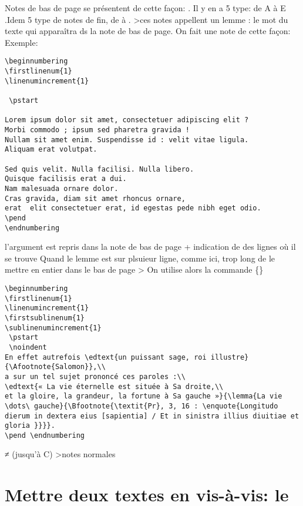 Notes de bas de page se présentent de cette façon:  . Il y en a 5 type: de A à E
.Idem 5 type de notes de fin, de  à .
>ces notes appellent un lemme : le mot du texte qui apparaîtra ds la  note de bas de page. On fait une note de cette façon: 
Exemple: 
\begin{verbatim}
\beginnumbering 
\firstlinenum{1}
\linenumincrement{1}

 \pstart 

Lorem ipsum dolor sit amet, consectetuer adipiscing elit ?
Morbi commodo ; ipsum sed pharetra gravida !
Nullam sit amet enim. Suspendisse id : velit vitae ligula.
Aliquam erat volutpat.

Sed quis velit. Nulla facilisi. Nulla libero. 
Quisque facilisis erat a dui. 
Nam malesuada ornare dolor.
Cras gravida, diam sit amet rhoncus ornare, 
erat  elit consectetuer erat, id egestas pede nibh eget odio.
\pend
\endnumbering
\end{verbatim}

l'argument  est repris dans la note de bas de page + indication de des lignes où il se trouve 
Quand le lemme est sur plsuieur ligne, comme ici, trop long de le mettre en entier dans le bas de page > On utilise alors la commande \{\}

\begin{verbatim}
\beginnumbering 
\firstlinenum{1}
\linenumincrement{1}
\firstsublinenum{1} 
\sublinenumincrement{1}
 \pstart 
 \noindent
En effet autrefois \edtext{un puissant sage, roi illustre}{\Afootnote{Salomon}},\\
a sur un tel sujet prononcé ces paroles :\\
\edtext{« La vie éternelle est située à Sa droite,\\
et la gloire, la grandeur, la fortune à Sa gauche »}{\lemma{La vie \dots\ gauche}{\Bfootnote{\textit{Pr}, 3, 16 : \enquote{Longitudo dierum in dextera eius [sapientia] / Et in sinistra illius diuitiae et gloria }}}}.
\pend \endnumbering
\end{verbatim}
≠  (jusqu'à C) >notes normales



\section{Mettre deux textes en vis-à-vis: le }
